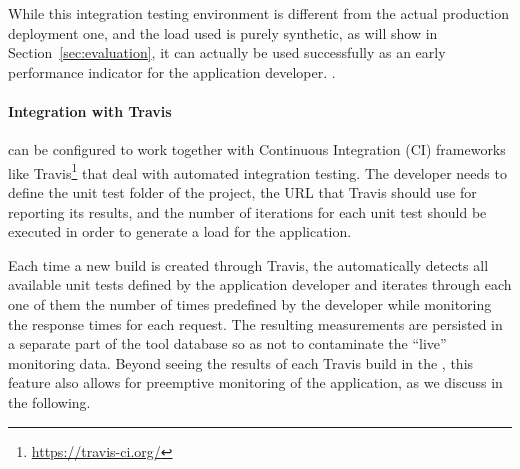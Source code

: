 \documentclass[conference]{IEEEtran}
\begin{document}
  
  While this integration testing environment is different from the actual production deployment one, and the load used is purely synthetic, as will show in Section~\ref{sec:evaluation}, it can actually be used successfully as an early performance indicator for the application developer. .  


  \paragraph{Integration with Travis}
  

   can be configured to work together with Continuous Integration (CI) frameworks like Travis\footnote{\url{https://travis-ci.org/}} that deal with automated integration testing.
  The developer needs to define the unit test folder of the project, the URL that Travis should use for reporting its results, and the number of iterations for each unit test should be executed in order to generate a load for the application. 
  
  Each time a new build is created through Travis, the \tool automatically detects all available unit tests defined by the application developer and iterates through each one of them the number of times predefined by the developer while monitoring the response times for each request. The resulting measurements are persisted in a separate part of the tool database so as not to contaminate the ``live'' monitoring data. Beyond seeing the results of each Travis build in the \tool, this feature also allows for preemptive monitoring of the application, as we discuss in the following.    

  
\end{document}
